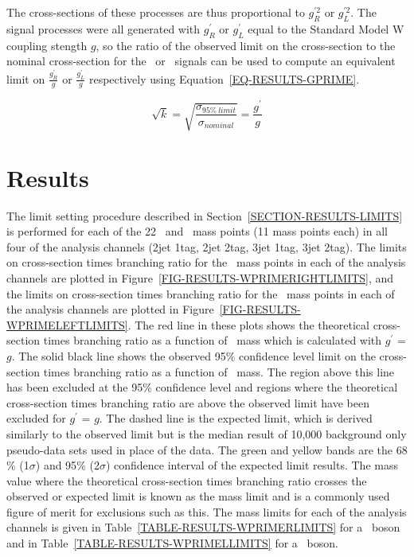 \noindent
The cross-sections of these processes are thus proportional to $g^{\prime 2}_R$ or $g^{\prime 2}_L$. The signal processes were all generated with $g^\prime_R$ or $g^\prime_L$ equal to the Standard Model W coupling stength $g$, so the ratio of the observed limit on the cross-section to the nominal cross-section for the \WprimeR\ or \WprimeL\ signals can be used to compute an equivalent limit on $\frac{g^{\prime}_R}{g}$ or $\frac{g^{\prime}_L}{g}$ respectively using Equation~\ref{EQ-RESULTS-GPRIME}.

\begin{equation}
\label{EQ-RESULTS-GPRIME}
\sqrt{k} = \sqrt{\frac{\sigma_{95\%\ limit}}{\sigma_{nominal}}} = \frac{g^\prime}{g}
\end{equation}


\section{Results}
\label{SECTION-RESULTS-RESULTS}
The limit setting procedure described in Section~\ref{SECTION-RESULTS-LIMITS} is performed for each of the 22 \WprimeR\ and \WprimeL\ mass points (11 mass points each) in all four of the analysis channels (2jet 1tag, 2jet 2tag, 3jet 1tag, 3jet 2tag). The limits on cross-section times branching ratio for the \WprimeR\ mass points in each of the analysis channels are plotted in Figure~\ref{FIG-RESULTS-WPRIMERIGHTLIMITS}, and the limits on cross-section times branching ratio for the \WprimeL\ mass points in each of the analysis channels are plotted in Figure~\ref{FIG-RESULTS-WPRIMELEFTLIMITS}. The red line in these plots shows the theoretical cross-section times branching ratio as a function of \Wprime\ mass which is calculated with $g^\prime$ = $g$. The solid black line shows the observed 95$\%$ confidence level limit on the cross-section times branching ratio as a function of \Wprime\ mass. The region above this line has been excluded at the 95$\%$ confidence level and regions where the theoretical cross-section times branching ratio are above the observed limit have been excluded for $g^\prime$ = $g$. The dashed line is the expected limit, which is derived similarly to the observed limit but is the median result of 10,000 background only pseudo-data sets used in place of the data. The green and yellow bands are the 68$\%$ (1$\sigma$) and 95$\%$ (2$\sigma$) confidence interval of the expected limit results. The mass value where the theoretical cross-section times branching ratio crosses the observed or expected limit is known as the mass limit and is a commonly used figure of merit for exclusions such as this. The mass limits for each of the analysis channels is given in Table~\ref{TABLE-RESULTS-WPRIMERLIMITS} for a \WprimeR\ boson and in Table~\ref{TABLE-RESULTS-WPRIMELLIMITS} for a \WprimeL\ boson.

